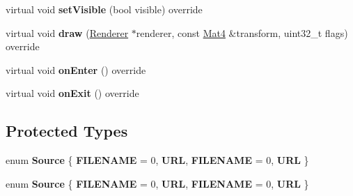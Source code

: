 \begin{DoxyCompactItemize}
virtual void {\bfseries set\+Visible} (bool visible) override
\item 
\mbox{\label{classexperimental_1_1ui_1_1VideoPlayer_a826447649569991f4bed709faee88e7a}} 
virtual void {\bfseries draw} (\hyperlink{classRenderer}{Renderer} $\ast$renderer, const \hyperlink{classMat4}{Mat4} \&transform, uint32\+\_\+t flags) override
\item 
\mbox{\label{classexperimental_1_1ui_1_1VideoPlayer_a34ce9b072958d0f9029724551bfbeec8}} 
virtual void {\bfseries on\+Enter} () override
\item 
\mbox{\label{classexperimental_1_1ui_1_1VideoPlayer_ad0fd0948305759e347a6b26f0020fc57}} 
virtual void {\bfseries on\+Exit} () override
\end{DoxyCompactItemize}
\subsection*{Protected Types}
\begin{DoxyCompactItemize}
\item 
\mbox{\label{classexperimental_1_1ui_1_1VideoPlayer_a8a681e7c5307008e77b46d9846cb1631}} 
enum {\bfseries Source} \{ {\bfseries F\+I\+L\+E\+N\+A\+ME} = 0, 
{\bfseries U\+RL}, 
{\bfseries F\+I\+L\+E\+N\+A\+ME} = 0, 
{\bfseries U\+RL}
 \}
\item 
\mbox{\label{classexperimental_1_1ui_1_1VideoPlayer_a8a681e7c5307008e77b46d9846cb1631}} 
enum {\bfseries Source} \{ {\bfseries F\+I\+L\+E\+N\+A\+ME} = 0, 
{\bfseries U\+RL}, 
{\bfseries F\+I\+L\+E\+N\+A\+ME} = 0, 
{\bfseries U\+RL}
 \}
\end{DoxyCompactItemize}
